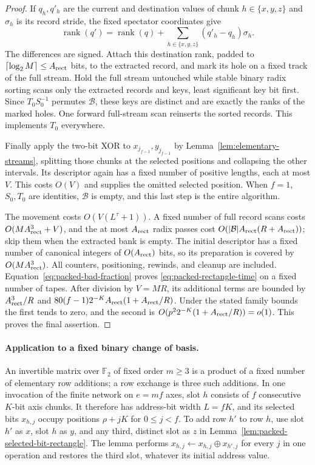 \documentclass[11pt]{article}
\theoremstyle{definition}
\begin{document}
\begin{proof}
If $q_h,q'_h$ are the current and destination values of chunk
$h\in\{x,y,z\}$ and $\sigma_h$ is its record stride, the fixed
spectator coordinates give
\[
 \operatorname{rank}(q')=\operatorname{rank}(q)+
       \sum_{h\in\{x,y,z\}}(q'_h-q_h)\sigma_h.
\]
The differences are signed. Attach this destination rank, padded to
$\lceil\log_2M\rceil\le A_{\rm rect}$ bits, to the extracted record, and mark its
hole on a fixed track of the full stream. Hold the full stream untouched
while stable binary radix sorting scans only the extracted records and
keys, least significant key bit first. Since $T_0S_0^{-1}$ permutes
$\mathcal B$, these keys are distinct and are exactly the ranks of the
marked holes. One forward full-stream scan reinserts the sorted records.
This implements $T_0$ everywhere.

Finally apply the two-bit XOR to $x_{j_{f-1}},y_{j_{f-1}}$ by
Lemma~\ref{lem:elementary-streams}, splitting those chunks at the
selected positions and collapsing the other intervals. Its descriptor
again has a fixed number of positive lengths, each at most $V$.
This costs $O(V)$ and supplies the omitted selected position. When
$f=1$, $S_0,T_0$ are identities, $\mathcal B$ is empty, and this last
step is the entire algorithm.

The movement costs $O(V(L^\tau+1))$. A fixed number of full record scans
costs $O(MA_{\rm rect}^3+V)$, and the at most $A_{\rm rect}$ radix passes cost
$O(|\mathcal B|A_{\rm rect}(R+A_{\rm rect}))$; skip them when the extracted bank is empty.
The initial descriptor has a fixed number of canonical integers of
$O(A_{\rm rect})$ bits, so its preparation is covered by $O(MA_{\rm rect}^3)$.
All counters, positioning, rewinds, and cleanup are included.
Equation~\eqref{eq:packed-bad-fraction} proves
\eqref{eq:packed-rectangle-time} on a fixed number of tapes.
After division by $V=MR$, its additional terms are bounded by
$A_{\rm rect}^3/R$ and
$80(f-1)2^{-K}A_{\rm rect}(1+A_{\rm rect}/R)$. Under the stated family bounds
the first tends to zero, and the second is
$O(p^2 2^{-K}(1+A_{\rm rect}/R))=o(1)$. This proves the final assertion.
\end{proof}

\paragraph{Application to a fixed binary change of basis.}
An invertible matrix over $\mathbb F_2$ of fixed order $m\ge3$ is a
product of a fixed number of elementary row additions; a row exchange
is three such additions.  In one invocation of the finite network on
$e=mf$ axes, slot $h$ consists of $f$ consecutive $K$-bit axis chunks.
It therefore has address-bit width $L=fK$, and its selected bits
$x_{h,j}$ occupy positions $\rho+jK$ for $0\le j<f$.
To add row $h'$ to row $h$, use slot $h'$ as $x$,
slot $h$ as $y$, and any third, distinct slot as $z$ in
Lemma~\ref{lem:packed-selected-bit-rectangle}.  The lemma performs
$x_{h,j}\leftarrow x_{h,j}\mathbin\oplus x_{h',j}$ for every $j$ in
one operation and restores the third slot, whatever its initial
address value.
\end{document}
